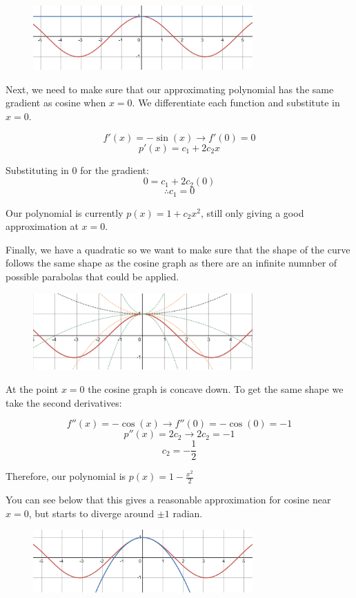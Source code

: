 \documentclass[../main.tex]{subfiles}
\begin{document}
\begin{figure}[h]
    \centering
    \includegraphics[width=0.75\textwidth]{images/taylorseries2.png}
\end{figure}

Next, we need to make sure that our approximating polynomial has the same gradient as cosine when $x=0$. We differentiate each function and substitute in $x=0$.

\[f'(x)=-\sin{(x)} \rightarrow f'(0)=0\]
\[p'(x)=c_1 + 2c_2x\]

Substituting in 0 for the gradient:
\[0=c_1 + 2c_2(0)\]
\[\therefore c_1=0\]

Our polynomial is currently $p(x) = 1 + c_2x^2$, still only giving a good approximation at $x=0$.

Finally, we have a quadratic so we want to make sure that the shape of the curve follows the same shape as the cosine graph as there are an infinite numnber of possible parabolas that could be applied. 

\begin{figure}[h]
    \centering
    \includegraphics[width=0.75\textwidth]{images/taylorseries3a.png}
\end{figure}

At the point $x=0$ the cosine graph is concave down. To get the same shape we take the second derivatives:

\[f''(x)=-\cos{(x)} \rightarrow f''(0)=-\cos{(0)}=-1\]
\[p''(x)= 2c_2 \rightarrow 2c_2 = -1\]
\[c_2 = -\frac{1}{2}\]

Therefore, our polynomial is $p(x) = 1 - \frac{x^2}{2}$ 

You can see below that this gives a reasonable approximation for cosine near $x=0$, but starts to diverge around $\pm1$ radian.

\begin{figure}[h]
    \centering
    \includegraphics[width=0.75\textwidth]{images/taylorseries3.png}
\end{figure}
\end{document}
